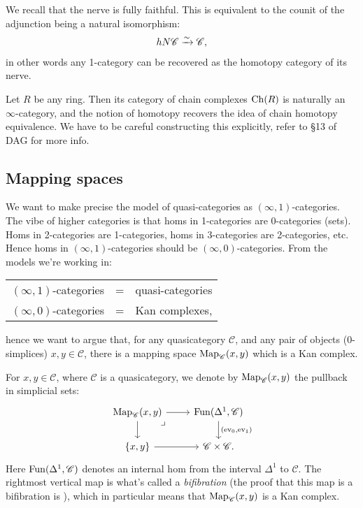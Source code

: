 \documentclass[11pt,openany]{book}
\begin{document}
\begin{remark} We recall that the nerve is fully faithful. This is equivalent to the counit of the adjunction being a natural isomorphism:
\begin{align*}
    hN\mathscr{C} \xrightarrow{\sim} \mathscr{C},
\end{align*}
in other words any 1-category can be recovered as the homotopy category of its nerve.
\end{remark}

\begin{example} Let $R$ be any ring. Then its category of chain complexes $\mathrm{Ch}(R)$ is naturally an $\infty$-category, and the notion of homotopy recovers the idea of chain homotopy equivalence. We have to be careful constructing this explicitly, refer to \S13 of DAG for more info.
\end{example}


\subsection{Mapping spaces}


We want to make precise the model of quasi-categories as $(\infty,1)$-categories. The vibe of higher categories is that homs in 1-categories are 0-categories (sets). Homs in 2-categories are 1-categories, homs in 3-categories are 2-categories, etc. Hence homs in $(\infty,1)$-categories should be $(\infty,0)$-categories. From the models we're working in:

\begin{center} 
\begin{tabular}{l  l  l}
$(\infty,1)$-categories & = & quasi-categories \\
$(\infty,0)$-categories & = & Kan complexes,
\end{tabular}
\end{center}
hence we want to argue that, for any quasicategory $\mathscr{C}$, and any pair of objects (0-simplices) $x,y\in \mathscr{C}$, there is a mapping space $\mathrm{Map}_\mathscr{C}(x,y)$ which is a Kan complex.



\begin{definition} For $x,y\in \mathscr{C}$, where $\mathscr{C}$ is a quasicategory, we denote by $\mathrm{Map}_{\mathscr{C}}(x,y)$ the pullback in simplicial sets:
\[ \begin{tikzcd}
    {\Map_{\mathscr{C}}(x,y)}\rar\dar\pb & {\Fun(\Delta^1,\mathscr{C})}\dar["{(\ev_0,\ev_1)}" right]\\
    {\{x,y\}}\rar & \mathscr{C} \times \mathscr{C}.
\end{tikzcd} \]
Here $\mathrm{Fun}(\Delta^1,\mathscr{C})$ denotes an internal hom from the interval $\Delta^1$ to $\mathscr{C}$. The rightmost vertical map is what's called a \textit{bifibration} (the proof that this map is a bifibration is \cite[2.4.7.11]{HTT}), which in particular means that $\mathrm{Map}_{\mathscr{C}}(x,y)$ is a Kan complex.
\end{definition}
\end{document}

